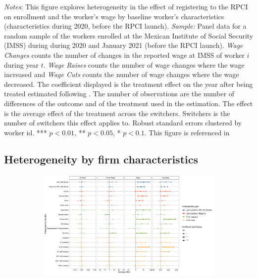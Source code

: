 \documentclass[oneside,11pt]{article}
\begin{document}
\scriptsize{
\noindent \textit{Notes}: This figure explores heterogeneity in the effect of registering to the RPCI on enrollment and the worker's wage by baseline worker's characteristics (characteristics during 2020, before the RPCI launch). \textit{Sample:} Panel data for a random sample of the workers enrolled at the Mexican Institute of Social Security (IMSS) during during 2020 and January 2021 (before the RPCI launch). \textit{Wage Changes} counts the number of changes in the reported wage at IMSS of worker $i$ during year $t$. \textit{Wage Raises} counts the number of wage changes where the wage increased and \textit{Wage Cuts} counts the number of wage changes where the wage decreased. The coefficient displayed is the treatment effect on the year after being treated estimated following \cite{de2020two}. The number of observations are the number of differences of the outcome and of the treatment used in the estimation. The effect is the average effect of the treatment across the switchers. Switchers is the number of switchers this effect applies to. Robust standard errors clustered by worker id. *** $p<0.01$, ** $p<0.05$, * $p<0.1$. This figure is referenced in %
}

\clearpage

\subsection{Heterogeneity by firm characteristics}

\begin{figure}[H]
    \centering
    \caption{Heterogeneity by firm characteristics \label{fig:heterogeneity_firm_rpci}}
    
    \begin{subfigure}{\textwidth}
    \includegraphics[width=\textwidth]{04_Figures/muestra_10porciento/dcdh_heterogeneity_firm_characteristics.pdf}
    \end{subfigure}
    
\end{figure}
\end{document}
